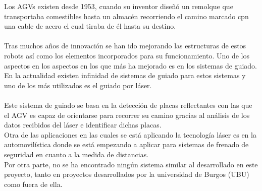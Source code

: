 
Los AGVs existen desde 1953, cuando su inventor diseñó un remolque que transportaba comestibles hasta un almacén recorriendo el camino marcado cpn una cable de acero el cual tiraba de él hasta su destino.\\
\\
Tras muchos años de innovación se han ido mejorando las estructuras de estos robots así como los elementos incorporados para su funcionamiento. Uno de los aspectos en los aspectos en los que más ha mejorado es en los sistemas de guiado. En la actualidad existen infinidad de sistemas de guiado para estos sistemas y uno de los más utilizados es el guiado por láser.\\
\\
Este sistema de guiado se basa en la detección de placas reflectantes con las que el AGV es capaz de orientarse para recorrer su camino gracias al análisis de los datos recibidos del láser e identificar dichas placas.\\
Otra de las aplicaciones en las cuales se está aplicando la tecnología láser es en la automovilística donde se está empezando a aplicar para sistemas de frenado de seguridad en cuanto a la medida de distancias.\\
Por otra parte, no se ha encontrado ningún sistema similar al desarrollado en este proyecto, tanto en proyectos desarrollados por la universidad de Burgos (UBU) como fuera de ella.